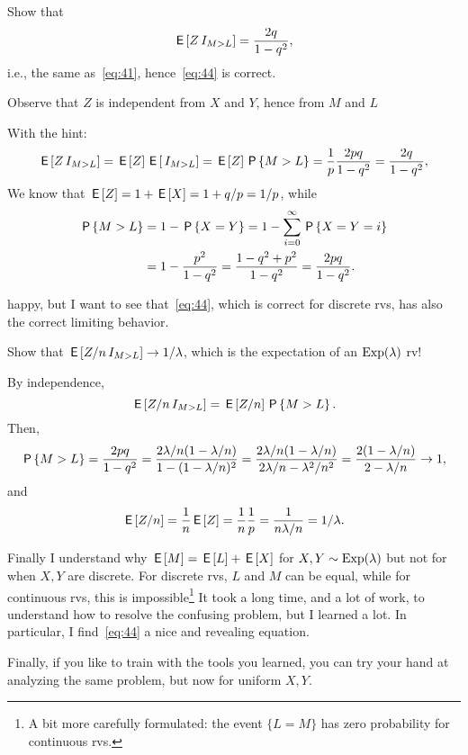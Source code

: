 \begin{exercise}
Show that
\begin{equation*}
\E{Z\1{M>L}} = \frac{2q} {1-q^{2}},
\end{equation*}
i.e., the same as~\cref{eq:41}, hence~\cref{eq:44} is correct.
\begin{hint}
Observe that $Z$   is independent from $X$ and $Y$, hence from $M$ and $L$
\end{hint}
\begin{solution} With the hint:
  \begin{align*}
\E{Z\1{M>L}}  = \E Z \E{\1{M>L}} = \E Z \P{M>L} = \frac 1 p \frac{2pq}{1-q^{2}} = \frac{2q}{1-q^{2}},
  \end{align*}
We know that $\E Z = 1 + \E X = 1 + q/p = 1/p$, while
\begin{align*}
\P{M>L}
&= 1-\P{X=Y} = 1-\sum_{i=0}^{\infty} \P{X=Y=i} \\
&= 1-\frac{p^{2}}{1-q^{2}} = \frac{1 - q^{2} + p^{2}}{1-q^{2}} = \frac{2pq}{1-q^{2}}.
\end{align*}
\end{solution}
\end{exercise}


 happy, but I want to see that~\eqref{eq:44}, which is correct for discrete rvs, has also the correct limiting behavior.
\begin{exercise}
Show that $\E{Z/n\1{M>L}} \to 1/\lambda$, which is the expectation of an $\Exp{\lambda}$ rv!
\begin{solution}
By independence,
  \begin{equation*}
\E{Z/n\1{M>L}} = \E{Z/n} \P{M>L}.
  \end{equation*}
Then,
\begin{equation*}
\P{M>L}   = \frac{2pq}{1-q^{2}}
= \frac{2\lambda/n (1-\lambda/n)}{1-(1-\lambda/n)^{2}}
= \frac{2\lambda/n (1-\lambda/n)}{2\lambda/n -\lambda^{2}/n^{2}}
= \frac{2 (1-\lambda/n)}{2 -\lambda/n}  \to 1,
\end{equation*}
and
\begin{equation*}
\E{Z/n} = \frac 1 n \E Z = \frac 1 n \frac 1 p = \frac 1 {n \lambda/ n} = 1/\lambda.
\end{equation*}
\end{solution}
\end{exercise}

Finally I understand why  $\E M = \E L + \E X$ for $X,Y\sim \Exp{\lambda}$ but not for when $X, Y$ are discrete. For discrete rvs, $L$ and $M$ can be equal, while for continuous rvs, this is impossible\footnote{A bit more carefully formulated: the event $\{L=M\}$ has zero probability for continuous rvs.} It took a long time, and a lot of work, to understand how to resolve the confusing problem, but I learned a lot.
In particular, I find~\cref{eq:44} a nice and revealing equation.

Finally, if you like to train with the  tools you learned,  you can try your hand at analyzing the same problem, but now for uniform $X, Y$.




